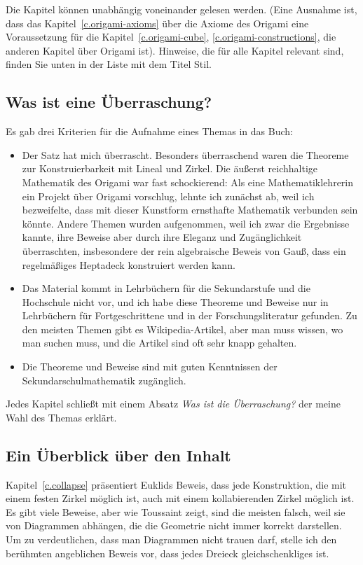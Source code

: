  Die Kapitel können unabhängig voneinander gelesen werden. (Eine Ausnahme ist, dass das Kapitel~\ref{c.origami-axioms} über die Axiome des Origami eine Voraussetzung für die Kapitel~\ref{c.origami-cube}, \ref{c.origami-constructions}, die anderen Kapitel über Origami ist). Hinweise, die für alle Kapitel relevant sind, finden Sie unten in der Liste mit dem Titel Stil.

\subsection*{Was ist eine Überraschung?}

Es gab drei Kriterien für die Aufnahme eines Themas in das Buch:
\begin{itemize}
\item Der Satz hat mich überrascht. Besonders überraschend waren die Theoreme zur Konstruierbarkeit mit Lineal und Zirkel. Die äußerst reichhaltige Mathematik des Origami war fast schockierend: Als eine Mathematiklehrerin ein Projekt über Origami vorschlug, lehnte ich zunächst ab, weil ich bezweifelte, dass mit dieser Kunstform ernsthafte Mathematik verbunden sein könnte.
Andere Themen wurden aufgenommen, weil ich zwar die Ergebnisse kannte, ihre Beweise aber durch ihre Eleganz und Zugänglichkeit überraschten, insbesondere der rein algebraische Beweis von Gauß, dass ein regelmäßiges Heptadeck konstruiert werden kann.

\item Das Material kommt in Lehrbüchern für die Sekundarstufe und die Hochschule nicht vor, und ich habe diese Theoreme und Beweise nur in Lehrbüchern für Fortgeschrittene und in der Forschungsliteratur gefunden. Zu den meisten Themen gibt es Wikipedia-Artikel, aber man muss wissen, wo man suchen muss, und die Artikel sind oft sehr knapp gehalten.

\item Die Theoreme und Beweise sind mit guten Kenntnissen der Sekundarschulmathematik zugänglich.
\end{itemize}
Jedes Kapitel schließt mit einem Absatz \textit{Was ist die Überraschung?} der meine Wahl des Themas erklärt.

\subsection*{Ein Überblick über den Inhalt}

Kapitel~\ref{c.collapse} präsentiert Euklids Beweis, dass jede Konstruktion, die mit einem festen Zirkel möglich ist, auch mit einem kollabierenden Zirkel möglich ist. Es gibt viele Beweise, aber wie Toussaint zeigt, sind die meisten falsch, weil sie von Diagrammen abhängen, die die Geometrie nicht immer korrekt darstellen. Um zu verdeutlichen, dass man Diagrammen nicht trauen darf, stelle ich den berühmten angeblichen Beweis vor, dass jedes Dreieck gleichschenkliges ist. 

